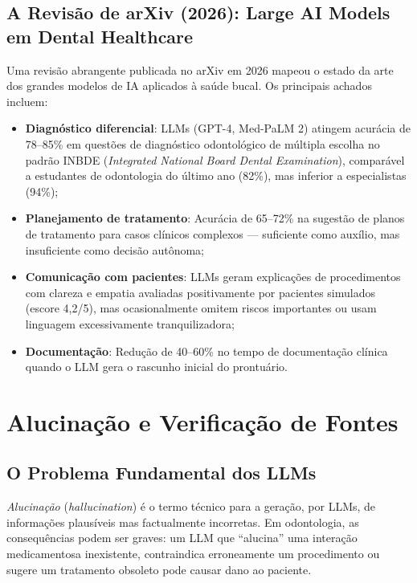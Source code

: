 \subsection{A Revisão de arXiv (2026): Large AI Models em Dental Healthcare}

Uma revisão abrangente publicada no arXiv em 2026 mapeou o estado da arte dos grandes modelos de IA aplicados à saúde bucal. Os principais achados incluem:

\begin{itemize}
    \item \textbf{Diagnóstico diferencial}: LLMs (GPT-4, Med-PaLM 2) atingem acurácia de 78--85\% em questões de diagnóstico odontológico de múltipla escolha no padrão INBDE (\textit{Integrated National Board Dental Examination}), comparável a estudantes de odontologia do último ano (82\%), mas inferior a especialistas (94\%);

    \item \textbf{Planejamento de tratamento}: Acurácia de 65--72\% na sugestão de planos de tratamento para casos clínicos complexos --- suficiente como auxílio, mas insuficiente como decisão autônoma;

    \item \textbf{Comunicação com pacientes}: LLMs geram explicações de procedimentos com clareza e empatia avaliadas positivamente por pacientes simulados (escore 4,2/5), mas ocasionalmente omitem riscos importantes ou usam linguagem excessivamente tranquilizadora;

    \item \textbf{Documentação}: Redução de 40--60\% no tempo de documentação clínica quando o LLM gera o rascunho inicial do prontuário.
\end{itemize}

\section{Alucinação e Verificação de Fontes}

\subsection{O Problema Fundamental dos LLMs}

\textit{Alucinação} (\textit{hallucination}) é o termo técnico para a geração, por LLMs, de informações plausíveis mas factualmente incorretas. Em odontologia, as consequências podem ser graves: um LLM que ``alucina'' uma interação medicamentosa inexistente, contraindica erroneamente um procedimento ou sugere um tratamento obsoleto pode causar dano ao paciente.

